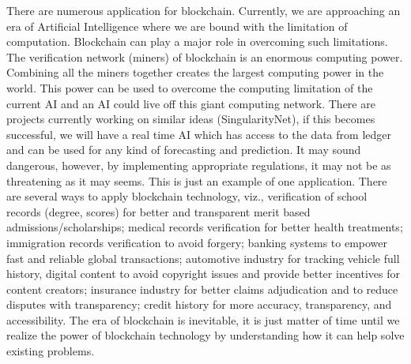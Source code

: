 \documentclass[DIV=calc, paper=a4, fontsize=11pt, twocolumn]{scrartcl}	 %
\begin{document}
There are numerous application for blockchain. Currently, we are approaching an era of Artificial Intelligence where we are bound with the limitation of computation. Blockchain can play a major role in overcoming such limitations. The verification network (miners) of blockchain is an enormous computing power. Combining all the miners together creates the largest computing power in the world. This power can be used to overcome the computing limitation of the current AI and an AI could live off this giant computing network. There are projects currently working on similar ideas (SingularityNet), if this becomes successful, we will have a real time AI which has access to the data from ledger and can be used for any kind of forecasting and prediction. It may sound dangerous, however, by implementing appropriate regulations, it may not be as threatening as it may seems. This is just an example of one application. There are several ways to apply blockchain technology, viz., verification of school records (degree, scores) for better and transparent merit based admissions/scholarships; medical records verification for better health treatments; immigration records verification to avoid forgery; banking systems to empower fast and reliable global transactions; automotive industry for tracking vehicle full history, digital content to avoid copyright issues and provide better incentives for content creators; insurance industry for better claims adjudication and to reduce disputes with transparency; credit history for more accuracy, transparency, and accessibility. The era of blockchain is inevitable, it is just matter of time until we realize the power of blockchain technology by understanding how it can help solve existing problems.
\end{document}
